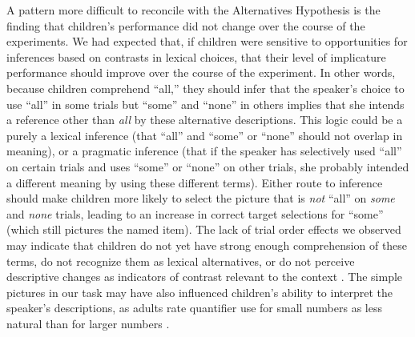\documentclass[10pt,letterpaper]{article}
\begin{document}
A pattern more difficult to reconcile with the Alternatives Hypothesis is the finding that children's performance did not change over the course of the experiments. We had expected that, if children were sensitive to opportunities for inferences based on contrasts in lexical choices, that their level of implicature performance should improve over the course of the experiment. In other words, because children comprehend ``all,'' they should infer that the speaker's choice to use ``all'' in some trials but ``some'' and ``none'' in others implies that she intends a reference other than \emph{all} by these alternative descriptions. This logic could be a purely a lexical inference (that ``all'' and ``some'' or ``none'' should not overlap in meaning), or a pragmatic inference (that if the speaker has selectively used ``all'' on certain trials and uses ``some'' or ``none'' on other trials, she probably intended a different meaning by using these different terms). Either route to inference should make children more likely to select the picture that is \emph{not} ``all'' on \emph{some} and \emph{none} trials, leading to an increase in correct target selections for ``some'' (which still pictures the named item). The lack of trial order effects we observed may indicate that children do not yet have strong enough comprehension of these terms, do not recognize them as lexical alternatives, or do not perceive descriptive changes as indicators of contrast relevant to the context \citep{skordos2014}. The simple pictures in our task may have also influenced children's ability to interpret the speaker's descriptions, as adults rate quantifier use for small numbers as less natural than for larger numbers \citep{degen2014b}. 




\end{document}
